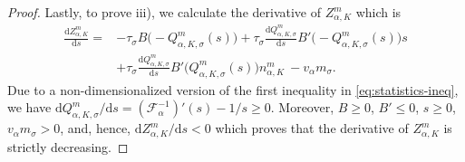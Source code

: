 \documentclass[10pt,a4paper]{amsart}
\begin{document}
\begin{proof}
    Lastly, to prove iii), we calculate the derivative of $Z_{\alpha, K}^m$ which is
    \begin{align*}
        \frac{\text{d} Z_{\alpha, K}^m}{ \text{d} s}
        = &- \tau_\sigma B \bigl(-Q_{\alpha, K, \sigma}^m(s)\bigr)
        + \tau_\sigma \frac{\text{d} Q_{\alpha, K, \sigma}^m}{\text{d} s} B' \bigl(-Q_{\alpha, K, \sigma}^m(s)\bigr) s\\
        ~
        &+ \tau_\sigma \frac{\text{d} Q_{\alpha, K, \sigma}^m}{\text{d} s} B'\bigl(Q_{\alpha, K, \sigma}^m (s) \bigr) n_{\alpha, K}^m
        ~
        - v_\alpha m_\sigma.
    \end{align*}
    Due to a non-dimensionalized version of the first inequality in \eqref{eq:statistics-ineq}, we have
    $
    \text{d} Q_{\alpha, K, \sigma}^m/ \text{d} s = ( \mathcal{F}_\alpha^{-1} )' (s) - 1/s \geq 0
    $.
    Moreover, $B \geq 0$, $ B' \leq 0$, $s \geq 0$, $v_\alpha m_\sigma >0$, and, hence, $\text{d} Z_{\alpha, K}^m/ \text{d} s < 0$ which proves that the derivative of $Z_{\alpha, K}^m$ is strictly decreasing.
\end{proof}
\end{document}
